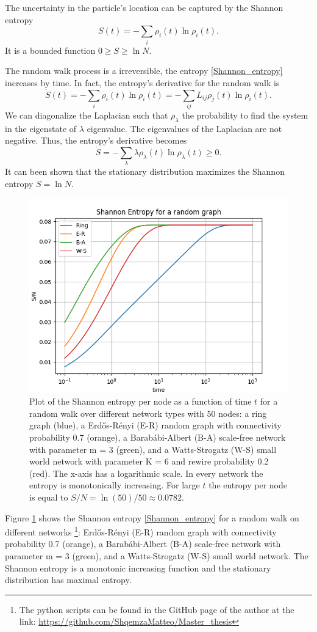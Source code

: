 The uncertainty in the particle's location can be captured by the Shannon entropy
\begin{equation}\label{Shannon_entropy}
    S(t) = -\sum_i \rho_i(t)\ln \rho_i(t).
\end{equation}
It is a bounded function $0\geq S \geq \ln N$.

The random walk process is a irreversible, the entropy \eqref{Shannon_entropy} increases by time. 
In fact, the entropy's derivative for the random walk is
\begin{equation}
        \dot S(t) = -\sum_i \dot\rho_i(t)\ln \rho_i(t) = -\sum_{ij} L_{ij} \rho_j(t)\ln \rho_i(t).
\end{equation}
We can diagonalize the Laplacian such that $\rho_\lambda$ the probability to find the system in the eigenstate of $\lambda$ eigenvalue.
The eigenvalues of the Laplacian are not negative. Thus, the entropy's derivative becomes
\begin{equation}
    \dot S = -\sum_\lambda \lambda \rho_\lambda(t) \ln \rho_\lambda(t) \geq 0.
\end{equation}
It can been shown that the stationary distribution maximizes the Shannon entropy $S = \ln N$.


\begin{figure}[ht!]
    \centering
    \includegraphics[width=0.70\linewidth]{image/Shannon_entropy.png}
    \caption{Plot of the Shannon entropy per node as a function of time $t$ for a random walk over different network types with 50 nodes: a ring graph (blue), a Erd\H{o}s-Rényi (E-R) random graph with connectivity probability 0.7 (orange), a Barab\'abi-Albert (B-A) scale-free network with parameter m = 3 (green), and a Watts-Strogatz (W-S) small world network with parameter K = 6 and rewire probability 0.2 (red). The x-axis has a logarithmic scale. In every network the entropy is monotonically increasing. For large $t$ the entropy per node is equal to $S/N = \ln(50)/50 \approx 0.0782$. }
    \label{Fig:Shannon_entropy}
\end{figure}
Figure \ref{Fig:Shannon_entropy} shows the Shannon entropy \eqref{Shannon_entropy} for a random walk on different networks \footnote{The python scripts can be found in the GitHub page of the author at the link: \url{https://github.com/ShqemzaMatteo/Master_thesis}}: Erd\H{o}s-Rényi (E-R) random graph with connectivity probability 0.7 (orange), a Barab\'abi-Albert (B-A) scale-free network with parameter m = 3 (green), and a Watts-Strogatz (W-S) small world network. The Shannon entropy is a monotonic increasing function and the stationary distribution has maximal entropy.